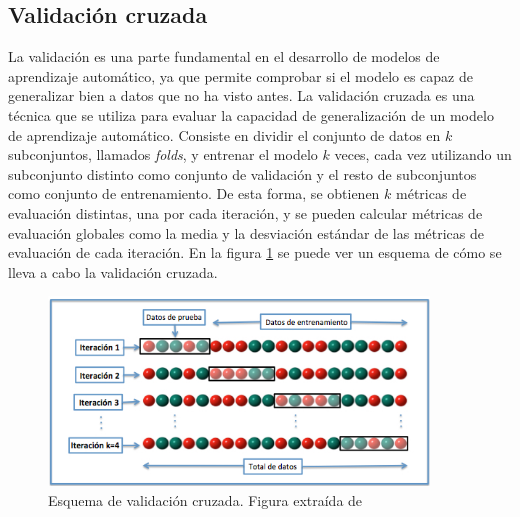 \subsection{Validación cruzada}
La validación es una parte fundamental en el desarrollo de modelos de aprendizaje automático, ya que permite comprobar si el modelo es capaz de generalizar bien a datos que no ha visto antes. La validación cruzada es una técnica que se utiliza para evaluar la capacidad de generalización de un modelo de aprendizaje automático. Consiste en dividir el conjunto de datos en $k$ subconjuntos, llamados \textit{folds}, y entrenar el modelo $k$ veces, cada vez utilizando un subconjunto distinto como conjunto de validación y el resto de subconjuntos como conjunto de entrenamiento. De esta forma, se obtienen $k$ métricas de evaluación distintas, una por cada iteración, y se pueden calcular métricas de evaluación globales como la media y la desviación estándar de las métricas de evaluación de cada iteración. En la figura \ref{fig:cross_validation} se puede ver un esquema de cómo se lleva a cabo la validación cruzada.

\begin{figure}[H]
    \centering
    \includegraphics[width=0.9\textwidth]{img/K-fold_cross_validation.jpg}
    \caption{Esquema de validación cruzada. Figura extraída de \cite{KFoldCV_image}}
    \label{fig:cross_validation}
\end{figure}

